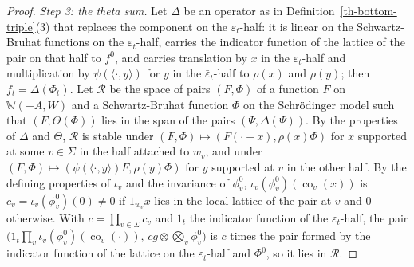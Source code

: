 \begin{proof}
\emph{Step 3: the theta sum.} Let $\Delta$ be an operator as in
Definition~\ref{th-bottom-triple}(3) that replaces the component on the
$\varepsilon_t$-half: it is linear on the Schwartz-Bruhat functions on the
$\varepsilon_t$-half, carries the indicator function of the lattice of the pair
on that half to $f^0$, and carries translation by $x$ in the
$\varepsilon_t$-half and multiplication by $\psi(\langle\cdot,y\rangle)$ for $y$
in the $\bar\varepsilon_t$-half to $\rho(x)$ and $\rho(y)$; then
$f_t=\Delta(\Phi_t)$. Let $\mathcal R$ be the space of pairs $(F,\Phi)$ of a
function $F$ on $\mathbb W(-A,W)$ and a Schwartz-Bruhat function $\Phi$ on the
Schrödinger model such that $(F,\Theta(\Phi))$ lies in the span of the pairs
$(\Psi,\Delta(\Psi))$. By the properties of $\Delta$ and $\Theta$, $\mathcal R$
is stable under $(F,\Phi)\mapsto(F(\cdot+x),\rho(x)\Phi)$ for $x$ supported at
some $v\in\Sigma$ in the half attached to $w_v$, and under
$(F,\Phi)\mapsto(\psi(\langle\cdot,y\rangle)F,\rho(y)\Phi)$ for $y$ supported at
$v$ in the other half. By the defining properties of $\iota_v$ and the
invariance of $\phi^0_v$, $\iota_v(\phi^0_v)(\operatorname{co}_v(x))$ is
$c_v=\iota_v(\phi^0_v)(0)\neq0$ if $1_{w_v}x$ lies in the local lattice of the
pair at $v$ and $0$ otherwise. With $c=\prod_{v\in\Sigma}c_v$ and $1_t$ the indicator
function of the $\varepsilon_t$-half, the pair
$\bigl(1_t\prod_v\iota_v(\phi^0_v)(\operatorname{co}_v(\cdot)),\,cg\otimes\bigotimes_v\phi^0_v\bigr)$
is $c$ times the pair formed by the indicator function of the lattice on the
$\varepsilon_t$-half and $\Phi^0$, so it lies in $\mathcal R$.


\end{proof}
